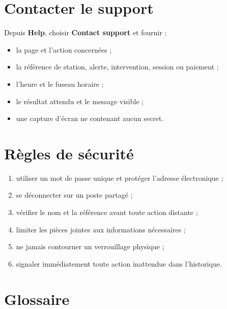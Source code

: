 \section{Contacter le support}

Depuis \textbf{Help}, choisir \textbf{Contact support} et fournir :

\begin{itemize}[leftmargin=1.6em]
  \item la page et l'action concernées ;
  \item la référence de station, alerte, intervention, session ou paiement ;
  \item l'heure et le fuseau horaire ;
  \item le résultat attendu et le message visible ;
  \item une capture d'écran ne contenant aucun secret.
\end{itemize}


\section{Règles de sécurité}

\begin{enumerate}[leftmargin=1.6em]
  \item utiliser un mot de passe unique et protéger l'adresse électronique ;
  \item se déconnecter sur un poste partagé ;
  \item vérifier le nom et la référence avant toute action distante ;
  \item limiter les pièces jointes aux informations nécessaires ;
  \item ne jamais contourner un verrouillage physique ;
  \item signaler immédiatement toute action inattendue dans l'historique.
\end{enumerate}

\section{Glossaire}

